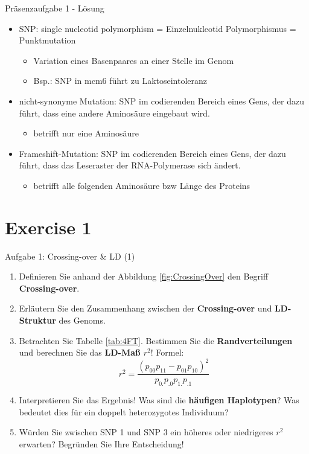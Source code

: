 \documentclass{beamer}
\begin{document}
\begin{frame}{Präsenzaufgabe 1 - Lösung}

\begin{itemize}
    \item SNP: single nucleotid polymorphism = Einzelnukleotid Polymorphismus = Punktmutation
    \begin{itemize}
        \item Variation eines Basenpaares an einer Stelle im Genom
        \item Bsp.: SNP in mcm6 führt zu Laktoseintoleranz
    \end{itemize}
    \item nicht-synonyme Mutation: SNP im codierenden Bereich eines Gens, der dazu führt, dass eine andere Aminosäure eingebaut wird.
    \begin{itemize}
        \item betrifft nur eine Aminosäure
    \end{itemize}
    \item Frameshift-Mutation: SNP im codierenden Bereich eines Gens, der dazu führt, dass das Leseraster der RNA-Polymerase sich ändert. 
        \begin{itemize}
        \item betrifft alle folgenden Aminosäure bzw Länge des Proteins
    \end{itemize}
\end{itemize}
\end{frame}

\section{Exercise 1}

\begin{frame}{Aufgabe 1: Crossing-over \& LD (1)}
\begin{enumerate}
    \item Definieren Sie anhand der Abbildung \ref{fig:CrossingOver} den Begriff \textbf{Crossing-over}.
    \item Erläutern Sie den Zusammenhang zwischen der \textbf{Crossing-over} und \textbf{LD-Struktur} des Genoms.
    \item Betrachten Sie Tabelle \ref{tab:4FT}. Bestimmen Sie die \textbf{Randverteilungen} und berechnen Sie das \textbf{LD-Maß $r^2$}! Formel: $$r^2 = \frac{(p_{00}p_{11} - p_{01}p_{10})^2}{p_{0.}p_{.0}p_{1.}p_{.1}}$$
    \item Interpretieren Sie das Ergebnis! Was sind die \textbf{häufigen Haplotypen}? Was bedeutet dies für ein doppelt heterozygotes Individuum?
    \item Würden Sie zwischen SNP 1 und SNP 3 ein höheres oder niedrigeres $r^2$ erwarten? Begründen Sie Ihre Entscheidung!
\end{enumerate} 
\end{frame}
\end{document}

